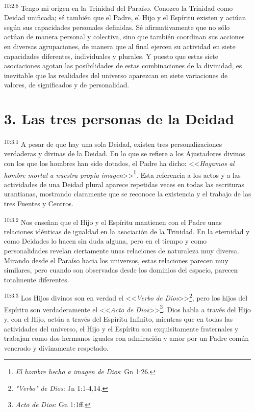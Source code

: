 \par
\textsuperscript{10:2.8} Tengo mi origen en la Trinidad del Paraíso. Conozco la Trinidad como Deidad unificada; sé también que el Padre, el Hijo y el Espíritu existen y actúan según sus capacidades personales definidas. Sé afirmativamente que no sólo actúan de manera personal y colectiva, sino que también coordinan sus acciones en diversas agrupaciones, de manera que al final ejercen su actividad en siete capacidades diferentes, individuales y plurales. Y puesto que estas siete asociaciones agotan las posibilidades de estas combinaciones de la divinidad, es inevitable que las realidades del universo aparezcan en siete variaciones de valores, de significados y de personalidad.

\section*{3. Las tres personas de la Deidad}
\par
\textsuperscript{10:3.1} A pesar de que hay una sola Deidad, existen tres personalizaciones verdaderas y divinas de la Deidad. En lo que se refiere a los Ajustadores divinos con los que los hombres han sido dotados, el Padre ha dicho: <<\textit{Hagamos al hombre mortal a nuestra propia imagen}>>\footnote{\textit{El hombre hecho a imagen de Dios}: Gn 1:26.}. Esta referencia a los actos y a las actividades de una Deidad plural aparece repetidas veces en todas las escrituras urantianas, mostrando claramente que se reconoce la existencia y el trabajo de las tres Fuentes y Centros.

\par
\textsuperscript{10:3.2} Nos enseñan que el Hijo y el Espíritu mantienen con el Padre unas relaciones idénticas de igualdad en la asociación de la Trinidad. En la eternidad y como Deidades lo hacen sin duda alguna, pero en el tiempo y como personalidades revelan ciertamente unas relaciones de naturaleza muy diversa. Mirando desde el Paraíso hacia los universos, estas relaciones parecen muy similares, pero cuando son observadas desde los dominios del espacio, parecen totalmente diferentes.

\par
\textsuperscript{10:3.3} Los Hijos divinos son en verdad el <<\textit{Verbo de Dios}>>\footnote{\textit{"Verbo" de Dios}: Jn 1:1-4,14.}, pero los hijos del Espíritu son verdaderamente el <<\textit{Acto de Dios}>>\footnote{\textit{Acto de Dios}: Gn 1:1ff.}. Dios habla a través del Hijo y, con el Hijo, actúa a través del Espíritu Infinito, mientras que en todas las actividades del universo, el Hijo y el Espíritu son exquisitamente fraternales y trabajan como dos hermanos iguales con admiración y amor por un Padre común venerado y divinamente respetado.

